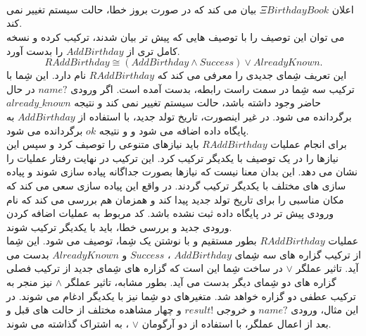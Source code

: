 \begin{figure}
\centering
\begin{schema}{}
 \Xi{}\\
 \\
\ST
{}\\
\end{schema}
\caption{}
\label{AlreadyKnown}
\end{figure} 
اعلان 
$\Xi\mathit{BirthdayBook}$
بیان می کند که در صورت بروز خطا، حالت سیستم تغییر نمی کند. 
\\
می توان این توصیف را با توصیف هایی که پیش تر بیان شدند، ترکیب کرده و نسخه کامل تری از 
$\mathit{AddBirthday}$
را بدست آورد.
\[
\mathit{RAddBirthday \cong (AddBirthday \wedge Success) \vee AlreadyKnown. }
\]
این تعریف شِمای جدیدی را معرفی می کند که 
$\mathit{RAddBirthday}$
نام دارد. این شِما با ترکیب سه شِما در سمت راست رابطه، بدست آمده است. اگر ورودی 
$\mathit{name?}$
در حال حاضر وجود داشته باشد، حالت سیستم تغییر نمی کند و نتیجه
$\mathit{already\_known}$
برگردانده می شود. در غیر اینصورت، تاریخ تولد جدید، با استفاده از 
$\mathit{AddBirthday}$
 به پایگاه داده اضافه می شود و و نتیجه 
$\mathit{ok}$
برگردانده می شود.
\\
برای انجام عملیات 
$\mathit{RAddBirthday}$
باید نیازهای متنوعی را توصیف کرد و سپس این نیازها را در یک توصیف با یکدیگر ترکیب کرد. این ترکیب در نهایت رفتار عملیات را نشان می دهد. این بدان معنا نیست که نیازها بصورت جداگانه پیاده سازی شوند و پیاده سازی های مختلف با یکدیگر ترکیب گردند. در واقع این پیاده سازی سعی می کند که مکان مناسبی را برای تاریخ تولد جدید پیدا کند و همزمان هم بررسی می کند که نام ورودی پیش تر در پایگاه داده ثبت نشده باشد. کد مربوط به عملیات اضافه کردن ورودی جدید و بررسی خطا، باید با یکدیگر ترکیب شوند. 
\\
 عملیات
 $\mathit{RAddBirthday}$
 بطور مستقیم و با نوشتن یک شِما، توصیف می شود. این شِما از ترکیب گزاره های سه شِمای 
 $\mathit{AddBirthday}$
 ،
 $\mathit{Success}$
 و
 $\mathit{AlreadyKnown}$
 بدست می آید. تاثیر عملگر 
 $\vee$
 در ساخت شِما این است که گزاره های شِمای جدید از ترکیب فصلی گزاره های دو شِمای دیگر بدست می آید. بطور مشابه، تاثیر عملگر
 $ \wedge$
 نیز منجر به ترکیب عطفی دو گزاره خواهد شد. متغیرهای دو شِما نیز با یکدیگر ادغام می شوند.
  در این مثال، ورودی
  $\mathit{name?}$
  و خروجی
  $\mathit{result!}$
  و چهار مشاهده مختلف از حالت های قبل و بعد از اعمال عملگر، با استفاده از دو آرگومان
   $\vee$
    ، به اشتراک گذاشته می شوند.   
